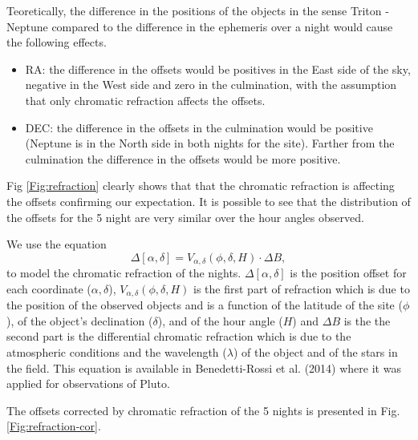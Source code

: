 \documentclass[12pt,a4paper]{report}
\begin{document}
Teoretically, the difference in the positions of the objects in the sense Triton - Neptune compared to the difference in the ephemeris over a night would cause the following effects.

\begin{itemize}
\item RA: the difference in the offsets would be positives in the East side of the sky, negative in the West side and zero in the culmination, with the assumption that only chromatic refraction affects the offsets.
\item DEC: the difference in the offsets in the culmination would be positive (Neptune is in the North side in both nights for the site). Farther from the culmination the difference in the offsets would be more positive.
\end{itemize}

Fig \ref{Fig:refraction} clearly shows that that the chromatic refraction is affecting the offsets confirming our expectation. It is possible to see that the distribution of the offsets for the 5 night are very similar over the hour angles observed.

We use the equation \:
\begin{equation}
\Delta [\alpha, \delta] = V_{\alpha,\delta} (\phi,\delta, H) \cdot \Delta B,
\label{Eq:refraction}
\end{equation}
to model the chromatic refraction of the nights. $\Delta [\alpha, \delta]$ is the position offset for each coordinate ($\alpha, \delta$), $V_{\alpha,\delta} (\phi,\delta, H)$ is the first part of refraction which is due to the position of the observed objects and is a function of the latitude of the site ($\phi$), of the object’s declination ($\delta$), and of the hour angle ($H$) and $\Delta B$ is the the second part is the differential chromatic refraction which is due to the atmospheric conditions and the wavelength ($\lambda$) of the object and of the stars in the field. This equation is available in Benedetti-Rossi et al. (2014) where it was applied for observations of Pluto.

The offsets corrected by chromatic refraction of the 5 nights is presented in Fig. \ref{Fig:refraction-cor}.
\end{document}
